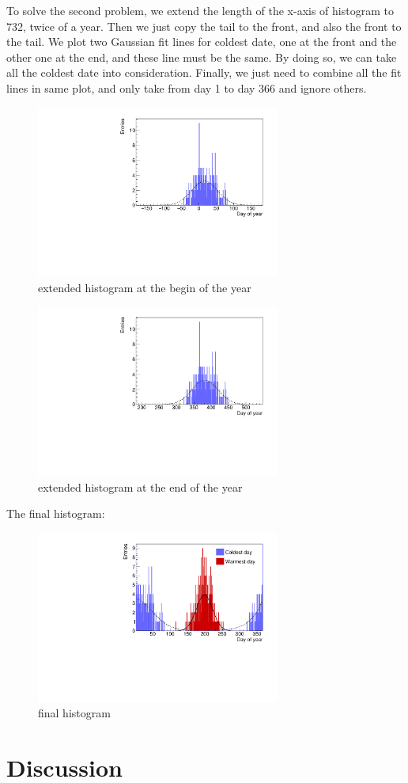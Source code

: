 \documentclass[a4paper]{article}
\begin{document}
\begin{enumerate}
To solve the second problem, we extend the length of the x-axis of histogram to 732, twice of a year. Then we just copy the tail to the front, and also the front to the tail. We plot two Gaussian fit lines for coldest date, one at the front and the other one at the end, and these line must be the same. By doing so, we can take all the coldest date into consideration. Finally, we just need to combine all the fit lines in same plot, and only take from day 1 to day 366 and ignore others.
\begin{figure}[htp]
    \centering
    \includegraphics[width=8cm]{./images/hotCold_Upp_cold_1}
    \caption{extended histogram at the begin of the year}
    \label{fig:hist}
\end{figure}
\begin{figure}[htp]
    \centering
    \includegraphics[width=8cm]{./images/hotCold_Upp_cold_2}
    \caption{extended histogram at the end of the year}
    \label{fig:hist}
\end{figure}

The final histogram:
\begin{figure}[htp]
    \centering
    \includegraphics[width=8cm]{./images/hotCold_Upp_final}
    \caption{final histogram}
    \label{fig:hist}
\end{figure}
\end{enumerate}


\section{Discussion}
\end{document}
